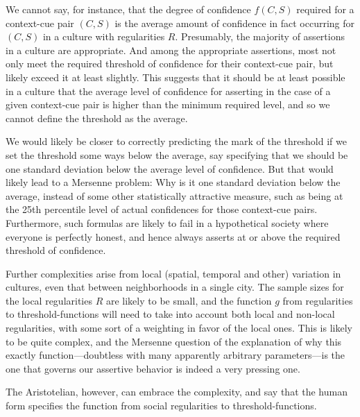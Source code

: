 We cannot say, for instance, that the degree of confidence $f(C,S)$ required for a context-cue pair $(C,S)$ 
is the average amount of confidence in fact occurring for $(C,S)$ in a culture with regularities $R$. Presumably,
the majority of assertions in a culture are appropriate. And among the appropriate assertions, most not only meet
the required threshold of confidence for their context-cue pair, but likely exceed it at least slightly. This 
suggests that it should be at least possible in a culture that the average level of confidence for asserting in 
the case of a given context-cue pair is higher than the minimum required level, and so we cannot define the 
threshold as the average. 

We would likely be closer to correctly predicting the mark of the threshold if we set the threshold some ways below
the average, say specifying that we should be one standard deviation below the 
average level of confidence. But that would likely lead to a Mersenne problem: Why is it one standard deviation below 
the average, instead of some other statistically attractive measure, such as being at the 25th percentile level of 
actual confidences for those context-cue pairs. Furthermore, such formulas are likely to fail in a hypothetical 
society where everyone is perfectly honest, and hence always asserts at or above the required threshold of confidence.

Further complexities arise from local (spatial, temporal and other) variation in cultures, even that between neighborhoods 
in a single city. The 
sample sizes for the local regularities $R$ are likely to be small, and the function $g$ from regularities to 
threshold-functions will need to take into account both local and non-local regularities, with some sort of a weighting 
in favor of the local ones. This is likely to be quite complex, and the Mersenne question of the explanation of 
why this exactly function---doubtless with many apparently arbitrary parameters---is the one that governs our 
assertive behavior is indeed a very pressing one. 

The Aristotelian, however, can embrace the complexity, and say that the human form specifies the function from social 
regularities to threshold-functions. 

\chaptertail

